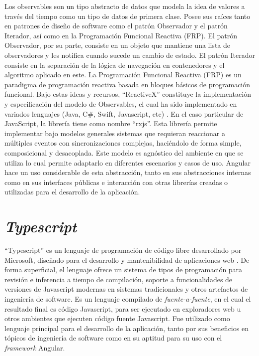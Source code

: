 Los observables son un tipo abstracto de datos que modela la idea de valores a través del tiempo como un tipo de datos de primera clase. Posee sus raíces tanto en patrones de diseño de software como el patrón Observador y el patrón Iterador, así como en la Programación Funcional Reactiva (FRP). El patrón Observador, por su parte, consiste en un objeto que mantiene una lista de observadores y les notifica cuando sucede un cambio de estado. El patrón Iterador consiste en la separación de la lógica de navegación en contenedores y el algoritmo aplicado en este. La Programación Funcional Reactiva (FRP) es un paradigma de programación reactiva basada en bloques básicos de programación funcional. Bajo estas ideas y recursos, ``ReactiveX'' constituye la implementación y especificación del modelo de Observables, el cual ha sido implementado en variados lenguajes (Java, C\#, Swift, Javascript, etc) \cite{reactivex}. En el caso particular de JavaScript, la librería tiene como nombre ``rxjs''. Esta librería permite implementar bajo modelos generales sistemas que requieran reaccionar a múltiples eventos con sincronizaciones complejas, haciéndolo de forma simple, composicional y desacoplada. Este modelo es agnóstico del ambiente en que se utiliza lo cual permite adaptarlo en diferentes escenarios y casos de uso. Angular hace un uso considerable de esta abstracción, tanto en sus abstracciones internas como en sus interfaces públicas e interacción con otras librerías creadas o utilizadas para el desarrollo de la aplicación.

\section{\textit{Typescript}}

``Typescript'' es un lenguaje de programación de código libre desarrollado por Microsoft, diseñado para el desarrollo y mantenibilidad de aplicaciones web \cite{typescript}. De forma superficial, el lenguaje ofrece un sistema de tipos de programación para revisión e inferencia a tiempo de compilación, soporte a funcionalidades de versiones de Javascript modernas en sistemas tradicionales y otros artefactos de ingeniería de software. Es un lenguaje compilado de \textit{fuente-a-fuente}, en el cual el resultado final es código Javascript, para ser ejecutado en exploradores web u otros ambientes que ejecuten código fuente Javascript. Fue utilizado como lenguaje principal para el desarrollo de la aplicación, tanto por sus beneficios en tópicos de ingeniería de software como en su aptitud para su uso con el \textit{framework} Angular.

